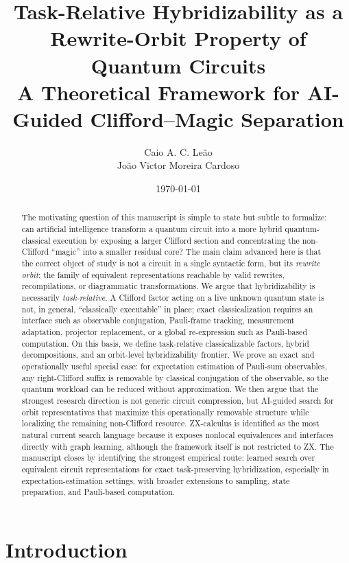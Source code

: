 \documentclass[11pt]{article}
\title{\textbf{Task-Relative Hybridizability as a Rewrite-Orbit Property of Quantum Circuits}\\[0.35em]
\large A Theoretical Framework for AI-Guided Clifford--Magic Separation}
\author{Caio A. C. Leão\\João Victor Moreira Cardoso}
\date{\today}
\theoremstyle{remark}
\begin{document}
\maketitle

\begin{abstract}
The motivating question of this manuscript is simple to state but subtle to formalize: can artificial intelligence transform a quantum circuit into a more hybrid quantum-classical execution by exposing a larger Clifford section and concentrating the non-Clifford ``magic'' into a smaller residual core? The main claim advanced here is that the correct object of study is not a circuit in a single syntactic form, but its \emph{rewrite orbit}: the family of equivalent representations reachable by valid rewrites, recompilations, or diagrammatic transformations. We argue that hybridizability is necessarily \emph{task-relative}. A Clifford factor acting on a live unknown quantum state is not, in general, ``classically executable'' in place; exact classicalization requires an interface such as observable conjugation, Pauli-frame tracking, measurement adaptation, projector replacement, or a global re-expression such as Pauli-based computation. On this basis, we define task-relative classicalizable factors, hybrid decompositions, and an orbit-level hybridizability frontier. We prove an exact and operationally useful special case: for expectation estimation of Pauli-sum observables, any right-Clifford suffix is removable by classical conjugation of the observable, so the quantum workload can be reduced without approximation. We then argue that the strongest research direction is not generic circuit compression, but AI-guided search for orbit representatives that maximize this operationally removable structure while localizing the remaining non-Clifford resource. ZX-calculus is identified as the most natural current search language because it exposes nonlocal equivalences and interfaces directly with graph learning, although the framework itself is not restricted to ZX. The manuscript closes by identifying the strongest empirical route: learned search over equivalent circuit representations for exact task-preserving hybridization, especially in expectation-estimation settings, with broader extensions to sampling, state preparation, and Pauli-based computation.
\end{abstract}

\section{Introduction}
\end{document}
